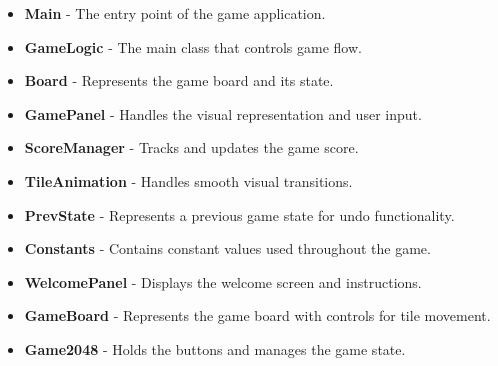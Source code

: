 \documentclass[12pt, a4paper]{article}
\begin{document}
\begin{itemize}
    \item \textbf{Main} - The entry point of the game application.
    \item \textbf{GameLogic} - The main class that controls game flow.
    \item \textbf{Board} - Represents the game board and its state.
    \item \textbf{GamePanel} - Handles the visual representation and user input.
    \item \textbf{ScoreManager} - Tracks and updates the game score.
    \item \textbf{TileAnimation} - Handles smooth visual transitions.
    \item \textbf{PrevState} - Represents a previous game state for undo functionality.
    \item \textbf{Constants} - Contains constant values used throughout the game.
    \item \textbf{WelcomePanel} - Displays the welcome screen and instructions.
    \item \textbf{GameBoard} - Represents the game board with controls for tile movement.
    \item \textbf{Game2048} - Holds the buttons and manages the game state.
\end{itemize}
\end{document}
